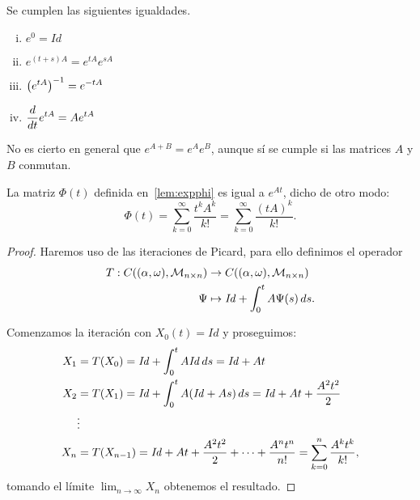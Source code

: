 \documentclass[../ecuaciones_diferenciales.tex]{subfiles}
\begin{document}
\begin{proposition}
	Se cumplen las siguientes igualdades.
	\begin{multicols}{2}
		\begin{enumerate}[(i)]
			\item \(\displaystyle e^0 = \mathit{Id}\)

			\item \(\displaystyle e^{(t + s)A} = e^{tA} e^{sA}\)

			\item \(\displaystyle \parens{e^{tA}}^{-1} = e^{-tA}\)

			\item \(\displaystyle \frac{d}{\mathop{d\!} t} e^{tA} = A e^{tA}\)
		\end{enumerate}
	\end{multicols}
\end{proposition}

\begin{remark}
	No es cierto en general que \(e^{A + B} = e^A e^B\), aunque sí se cumple si
    las matrices \(A\) y \(B\) conmutan.
\end{remark}

\begin{theorem}
	La matriz \(\Phi(t)\) definida en~\ref{lem:expphi} es igual a \(e^{At}\),
	dicho de otro modo:
	\[\Phi(t) = \sum_{k = 0}^\infty \frac{t^k A^k}{k!} =
		\sum_{k = 0}^\infty \frac{{(tA)}^k}{k!}.\]
\end{theorem}

\begin{proof}
	Haremos uso de las iteraciones de Picard, para ello definimos el operador
	\begin{align*}
		T : C((\alpha, \omega), \mathcal{M}_{n \times n}) 
		& \to C((\alpha, \omega), \mathcal{M}_{n \times n}) \\
		\Psi & \mapsto \mathit{Id} + \int_0^t A \Psi(s) \mathop{d\!} s.
	\end{align*}

	Comenzamos la iteración con \(X_0(t) = \mathit{Id}\) y proseguimos:
	\begin{align*}
		X_1 & = T(X_0) = \mathit{Id} + \int_0^t A \mathit{Id} \mathop{d\!} s =
		\mathit{Id} + At                                                      \\
		X_2 & = T(X_1) = \mathit{Id} + \int_0^t A (\mathit{Id} + As) \mathop{d\!} s =
		\mathit{Id} + At + \frac{A^2 t^2}{2}                                  \\
		    & \vdots                                                          \\
		X_n & = T(X_{n - 1}) =
		\mathit{Id} + At + \frac{A^2 t^2}{2} + \cdots + \frac{A^n t^n}{n!}
		= \sum_{k = 0}^n \frac{A^k t^k}{k!},
	\end{align*}
	tomando el límite \(\lim_{n \to \infty} X_n\) obtenemos el resultado.
\end{proof}
\end{document}
